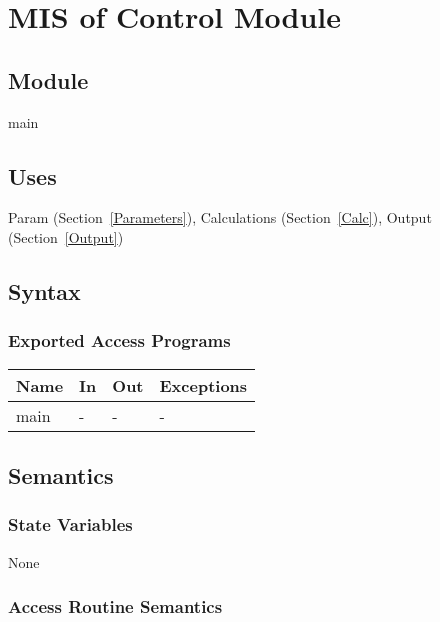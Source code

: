 \documentclass[12pt, titlepage]{article}
\begin{document}
\newpage

\section{MIS of Control Module} \label{Main}

\subsection{Module}

main

\subsection{Uses}

Param (Section~\ref{Parameters}), Calculations (Section~\ref{Calc}),
Output (Section~\ref{Output})

\subsection{Syntax}

\subsubsection{Exported Access Programs}

\begin{center}
\begin{tabular}{p{2cm} p{4cm} p{4cm} p{2cm}}
\hline
\textbf{Name} & \textbf{In} & \textbf{Out} & \textbf{Exceptions} \\
\hline
main & - & - & - \\
\hline
\end{tabular}
\end{center}

\subsection{Semantics}

\subsubsection{State Variables}

None

\subsubsection{Access Routine Semantics}
\end{document}
